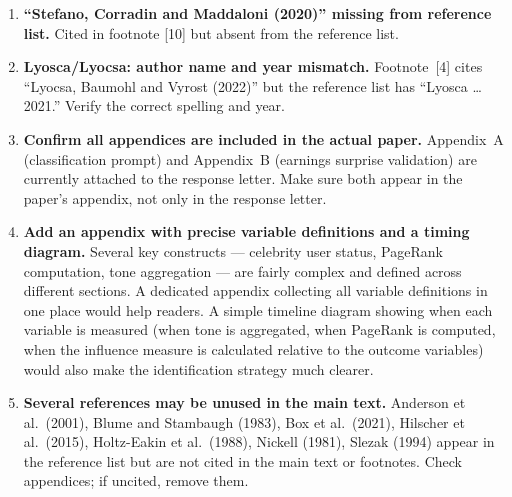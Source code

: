 \documentclass[11pt]{article}
\begin{document}
\begin{enumerate}
  \item \textbf{``Stefano, Corradin and Maddaloni (2020)'' missing from
    reference list.} Cited in footnote [10] but absent from the reference
    list.

  \item \textbf{Lyosca/Lyocsa: author name and year mismatch.} Footnote~[4]
    cites ``Lyocsa, Baumohl and Vyrost (2022)'' but the reference list has
    ``Lyosca \ldots 2021.'' Verify the correct spelling and year.

  \item \textbf{Confirm all appendices are included in the actual paper.}
    Appendix~A (classification prompt) and Appendix~B (earnings surprise
    validation) are currently attached to the response letter. Make sure both
    appear in the paper's appendix, not only in the response letter.

  \item \textbf{Add an appendix with precise variable definitions and a timing diagram.}
    Several key constructs --- celebrity user status, PageRank computation,
    tone aggregation --- are fairly complex and defined across different sections.
    A dedicated appendix collecting all variable definitions in one place would
    help readers. A simple timeline diagram showing when each variable is
    measured (when tone is aggregated, when PageRank is computed, when the
    influence measure is calculated relative to the outcome variables) would
    also make the identification strategy much clearer.

  \item \textbf{Several references may be unused in the main text.}
    Anderson et al.\ (2001), Blume and Stambaugh (1983), Box et al.\ (2021),
    Hilscher et al.\ (2015), Holtz-Eakin et al.\ (1988), Nickell (1981),
    Slezak (1994) appear in the reference list but are not cited in the main
    text or footnotes. Check appendices; if uncited, remove them.

\end{enumerate}
\end{document}

